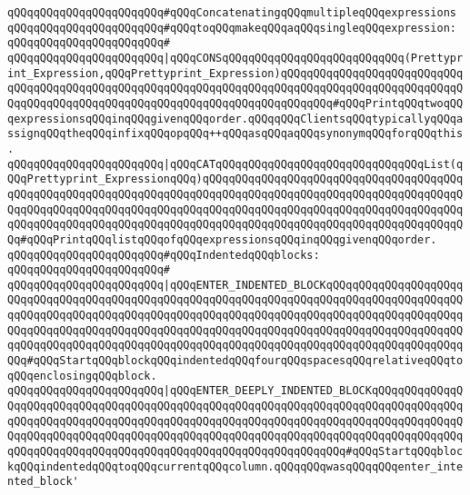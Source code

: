 \newline
\verb|qQQqqQQqqQQqqQQqqQQqqQQq#qQQqConcatenatingqQQqmultipleqQQqexpressions|\newline
\verb|qQQqqQQqqQQqqQQqqQQqqQQq#qQQqtoqQQqmakeqQQqaqQQqsingleqQQqexpression:|\newline
\verb|qQQqqQQqqQQqqQQqqQQqqQQq#|\newline
\verb|qQQqqQQqqQQqqQQqqQQqqQQq|\verb#|qQQqCONSqQQqqQQqqQQqqQQqqQQqqQQqqQQq(Prettyprint_Expression,qQQqPrettyprint_Expression)qQQqqQQqqQQqqQQqqQQqqQQqqQQqqQQqqQQqqQQqqQQqqQQqqQQqqQQqqQQqqQQqqQQqqQQqqQQqqQQqqQQqqQQqqQQqqQQqqQQqqQQqqQQqqQQqqQQqqQQqqQQqqQQqqQQqqQQqqQQqqQQqqQQq#\verb|#qQQqPrintqQQqtwoqQQqexpressionsqQQqinqQQqgivenqQQqorder.qQQqqQQqClientsqQQqtypicallyqQQqassignqQQqtheqQQqinfixqQQqopqQQq++qQQqasqQQqaqQQqsynonymqQQqforqQQqthis.|\newline
\verb|qQQqqQQqqQQqqQQqqQQqqQQq|\verb#|qQQqCATqQQqqQQqqQQqqQQqqQQqqQQqqQQqqQQqList(qQQqPrettyprint_ExpressionqQQq)qQQqqQQqqQQqqQQqqQQqqQQqqQQqqQQqqQQqqQQqqQQqqQQqqQQqqQQqqQQqqQQqqQQqqQQqqQQqqQQqqQQqqQQqqQQqqQQqqQQqqQQqqQQqqQQqqQQqqQQqqQQqqQQqqQQqqQQqqQQqqQQqqQQqqQQqqQQqqQQqqQQqqQQqqQQqqQQqqQQqqQQqqQQqqQQqqQQqqQQqqQQqqQQqqQQqqQQqqQQqqQQqqQQqqQQqqQQqqQQqqQQqqQQqqQQq#\verb|#qQQqPrintqQQqlistqQQqofqQQqexpressionsqQQqinqQQqgivenqQQqorder.|\newline
\newline
\verb|qQQqqQQqqQQqqQQqqQQqqQQq#qQQqIndentedqQQqblocks:|\newline
\verb|qQQqqQQqqQQqqQQqqQQqqQQq#|\newline
\verb|qQQqqQQqqQQqqQQqqQQqqQQq|\verb#|qQQqENTER_INDENTED_BLOCKqQQqqQQqqQQqqQQqqQQqqQQqqQQqqQQqqQQqqQQqqQQqqQQqqQQqqQQqqQQqqQQqqQQqqQQqqQQqqQQqqQQqqQQqqQQqqQQqqQQqqQQqqQQqqQQqqQQqqQQqqQQqqQQqqQQqqQQqqQQqqQQqqQQqqQQqqQQqqQQqqQQqqQQqqQQqqQQqqQQqqQQqqQQqqQQqqQQqqQQqqQQqqQQqqQQqqQQqqQQqqQQqqQQqqQQqqQQqqQQqqQQqqQQqqQQqqQQqqQQqqQQqqQQqqQQqqQQqqQQqqQQqqQQqqQQqqQQqqQQqqQQq#\verb|#qQQqStartqQQqblockqQQqindentedqQQqfourqQQqspacesqQQqrelativeqQQqtoqQQqenclosingqQQqblock.|\newline
\verb|qQQqqQQqqQQqqQQqqQQqqQQq|\verb#|qQQqENTER_DEEPLY_INDENTED_BLOCKqQQqqQQqqQQqqQQqqQQqqQQqqQQqqQQqqQQqqQQqqQQqqQQqqQQqqQQqqQQqqQQqqQQqqQQqqQQqqQQqqQQqqQQqqQQqqQQqqQQqqQQqqQQqqQQqqQQqqQQqqQQqqQQqqQQqqQQqqQQqqQQqqQQqqQQqqQQqqQQqqQQqqQQqqQQqqQQqqQQqqQQqqQQqqQQqqQQqqQQqqQQqqQQqqQQqqQQqqQQqqQQqqQQqqQQqqQQqqQQqqQQqqQQqqQQqqQQqqQQqqQQqqQQqqQQqqQQq#\verb|#qQQqStartqQQqblockqQQqindentedqQQqtoqQQqcurrentqQQqcolumn.qQQqqQQqwasqQQqqQQqenter_intented_block'|\newline
